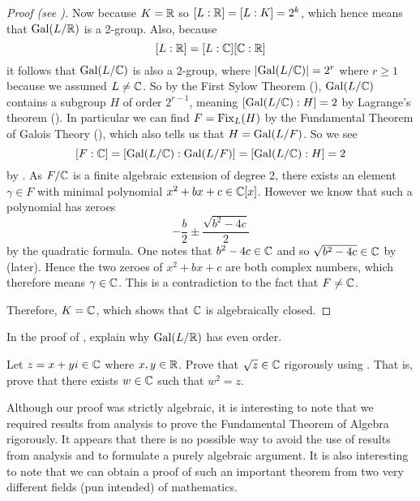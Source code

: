 \begin{proof}[Proof (see {\cite[Theorem 23.34]{judson_beezer_2022}})]
    Now because $K = \mathbb{R}$ so $[L:\mathbb{R}] = [L:K] = 2^k$, which hence means that $\mathrm{Gal}(L/\mathbb{R})$ is a 2-group. Also, because
    \[
        [L:\mathbb{R}] = [L:\mathbb{C}][\mathbb{C}:\mathbb{R}]
    \]
    it follows that $\mathrm{Gal}(L/\mathbb{C})$ is also a 2-group, where $|\mathrm{Gal}(L/\mathbb{C})| = 2^r$ where $r \geq 1$ because we assumed $L \neq \mathbb{C}$. So by the First Sylow Theorem (), $\mathrm{Gal}(L/\mathbb{C})$ contains a subgroup $H$ of order $2^{r-1}$, meaning $[\mathrm{Gal}(L/\mathbb{C}):H] = 2$ by Lagrange's theorem (). In particular we can find $F = \mathrm{Fix}_{L}(H)$ by the Fundamental Theorem of Galois Theory (), which also tells us that $H = \mathrm{Gal}(L/F)$. So we see
    \[
        [F:\mathbb{C}] = [\mathrm{Gal}(L/\mathbb{C}):\mathrm{Gal}(L/F)] = [\mathrm{Gal}(L/\mathbb{C}):H] = 2
    \]
    by . As $F/\mathbb{C}$ is a finite algebraic extension of degree 2, there exists an element $\gamma \in F$ with minimal polynomial $x^2 + bx + c \in \mathbb{C}[x]$. However we know that such a polynomial has zeroes
    \[
        -\frac b2 \pm \frac{\sqrt{b^2 - 4c}}2
    \]
    by the quadratic formula. One notes that $b^2 - 4c \in \mathbb{C}$ and so $\sqrt{b^2-4c} \in \mathbb{C}$ by  (later). Hence the two zeroes of $x^2 + bx + c$ are both complex numbers, which therefore means $\gamma \in \mathbb{C}$. This is a contradiction to the fact that $F \neq \mathbb{C}$.

    Therefore, $K = \mathbb{C}$, which shows that $\mathbb{C}$ is algebraically closed.
\end{proof}

\begin{exercise}\label{exercise-fta-real-extension-has-even-order}
    In the proof of , explain why $\mathrm{Gal}(L/\mathbb{R})$ has even order.
\end{exercise}

\begin{exercise}\label{exercise-square-root-of-complex-number-is-complex-number}
    Let $z = x + yi \in \mathbb{C}$ where $x, y \in \mathbb{R}$. Prove that $\sqrt{z} \in \mathbb{C}$ rigorously using . That is, prove that there exists $w \in \mathbb{C}$ such that $w^2 = z$.
\end{exercise}

Although our proof was strictly algebraic, it is interesting to note that we required results from analysis to prove the Fundamental Theorem of Algebra rigorously. It appears that there is no possible way to avoid the use of results from analysis and to formulate a purely algebraic argument. It is also interesting to note that we can obtain a proof of such an important theorem from two very different fields (pun intended) of mathematics.
